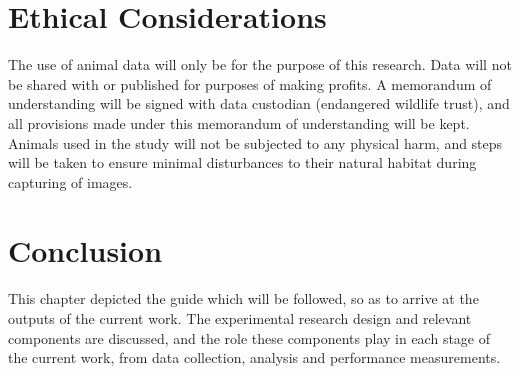 \section{Ethical Considerations}
The use of animal data will only be for the purpose of this research. Data will not be shared with or published for purposes of making profits. A memorandum of understanding will be signed with data custodian (endangered wildlife trust), and all provisions made under this memorandum of understanding will be kept. Animals used in the study will not be subjected to any physical harm, and steps will be taken to ensure minimal disturbances to their natural habitat during capturing of images. 

\section{Conclusion}
This chapter depicted the guide which will be followed, so as to arrive at the outputs of the current work. The experimental research design and relevant components are discussed, and the role these components play in each stage of the current work, from data collection, analysis and performance measurements. 
